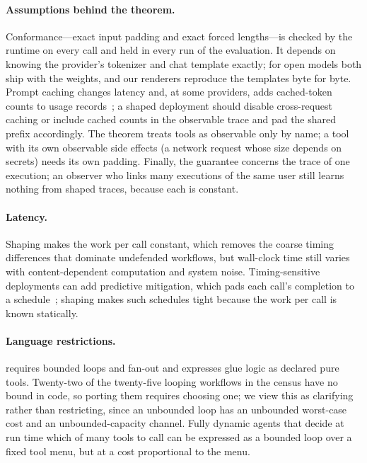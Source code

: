 \paragraph{Assumptions behind the theorem.} Conformance---exact input padding and exact forced lengths---is checked by the runtime on every call and held in every run of the evaluation. It depends on knowing the provider's tokenizer and chat template exactly; for open models both ship with the weights, and our renderers reproduce the templates byte for byte. Prompt caching changes latency and, at some providers, adds cached-token counts to usage records~\cite{gu2025caching}; a shaped deployment should disable cross-request caching or include cached counts in the observable trace and pad the shared prefix accordingly. The theorem treats tools as observable only by name; a tool with its own observable side effects (a network request whose size depends on secrets) needs its own padding. Finally, the guarantee concerns the trace of one execution; an observer who links many executions of the same user still learns nothing from shaped traces, because each is constant.

\paragraph{Latency.} Shaping makes the work per call constant, which removes the coarse timing differences that dominate undefended workflows, but wall-clock time still varies with content-dependent computation and system noise. Timing-sensitive deployments can add predictive mitigation, which pads each call's completion to a schedule~\cite{askarov2010predictive}; shaping makes such schedules tight because the work per call is known statically.

\paragraph{Language restrictions.} \sys requires bounded loops and fan-out and expresses glue logic as declared pure tools. Twenty-two of the twenty-five looping workflows in the census have no bound in code, so porting them requires choosing one; we view this as clarifying rather than restricting, since an unbounded loop has an unbounded worst-case cost and an unbounded-capacity channel. Fully dynamic agents that decide at run time which of many tools to call can be expressed as a bounded loop over a fixed tool menu, but at a cost proportional to the menu.

